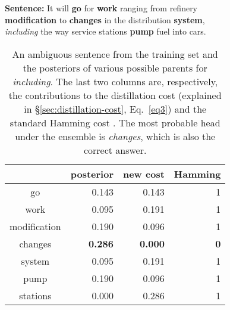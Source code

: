 \documentclass[11pt,letterpaper]{article}
\newcommand{\ignore}[1]{}
\newcommand{\miguelcomment}[1]{\ignore{\textcolor{red}{{\textbf{[#1 --\textsc{miguel}]}}}}}
\begin{document}
\begin{table}[t]
\ignore{\miguelcomment{Add Sentence: here or Example: here}} \textbf{Sentence:} It will \textbf{go} for \textbf{work} ranging from refinery\\ \textbf{modification} to \textbf{changes} in the distribution \textbf{system},\\ \emph{including} the way service stations \textbf{pump} fuel into cars.

\begin{center}
\begin{tabular}{|c|r|r|r|}
\hline
\multicolumn{1}{|c}{}                                                                       & \multicolumn{1}{|c|}{posterior}        &
\multicolumn{1}{c|}{new cost}                                                           &
\multicolumn{1}{c|}{Hamming}                                                               \\ \hline
go                                                                                               & 0.143   &  0.143    & 1                                                                                                            \\
work                                                                                                & 0.095  & 0.191 & 1                                                                                                                 \\
modification                                                                                        & 0.190            & 0.096     &1                                                                                                    \\
changes                                                                                             & \textbf{0.286}   & \textbf{0.000} & \textbf{0}                                                                                                                  \\
system                                                                                              & 0.095     & 0.191    & 1                                                                                                       \\
pump                                                                                               & 0.190 &0.096 & 1 \\
stations & 0.000 & 0.286 & 1 \\ \hline                                                                                                                   
\end{tabular}
\end{center}
\caption{An ambiguous sentence from the training set and the posteriors\protect\footnotemark{} of various possible parents for \emph{including}. The last two columns are, respectively, the contributions to the distillation cost 
(explained in \S\ref{sec:distillation-cost}, Eq.~\ref{eq3}) and the standard Hamming cost . The most probable head under the ensemble is \emph{changes}, which is also the correct answer.} \label{tab:qualitative_analysis}
\end{table}
\end{document}
